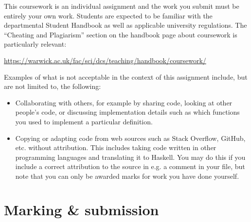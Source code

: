 This coursework is an individual assignment and the work you submit must be entirely your own work. Students are expected to be familiar with the departmental Student Handbook as well as applicable university regulations. The ``Cheating and Plagiarism'' section on the handbook page about coursework is particularly relevant:
\begin{center}\small
	\url{https://warwick.ac.uk/fac/sci/dcs/teaching/handbook/coursework/}
\end{center}
Examples of what is not acceptable in the context of this assignment include, but are not limited to, the following:
\begin{itemize}
	\item Collaborating with others, for example by sharing code, looking at other people's code, or discussing implementation details such as which functions you used to implement a particular definition. 
	
	\item Copying or adapting code from web sources such as Stack Overflow, GitHub, etc. without attribution. This includes taking code written in other programming languages and translating it to Haskell. You may do this if you include a correct attribution to the source in e.g. a comment in your file, but note that you can only be awarded marks for work you have done yourself. 
\end{itemize}

\section{Marking \& submission}

